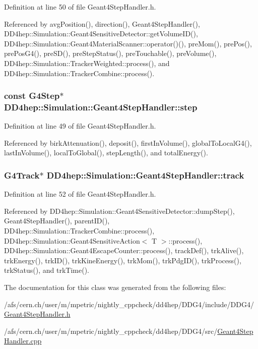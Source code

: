 Definition at line 50 of file Geant4StepHandler.h.

Referenced by avgPosition(), direction(), Geant4StepHandler(), DD4hep::Simulation::Geant4SensitiveDetector::getVolumeID(), DD4hep::Simulation::Geant4MaterialScanner::operator()(), preMom(), prePos(), prePosG4(), preSD(), preStepStatus(), preTouchable(), preVolume(), DD4hep::Simulation::TrackerWeighted::process(), and DD4hep::Simulation::TrackerCombine::process().\hypertarget{class_d_d4hep_1_1_simulation_1_1_geant4_step_handler_a5f8ecf6b8e58ab857df4d639d9b8f235}{
\subsubsection[{step}]{\setlength{\rightskip}{0pt plus 5cm}const G4Step$\ast$ {\bf DD4hep::Simulation::Geant4StepHandler::step}}}
\label{class_d_d4hep_1_1_simulation_1_1_geant4_step_handler_a5f8ecf6b8e58ab857df4d639d9b8f235}


Definition at line 49 of file Geant4StepHandler.h.

Referenced by birkAttenuation(), deposit(), firstInVolume(), globalToLocalG4(), lastInVolume(), localToGlobal(), stepLength(), and totalEnergy().\hypertarget{class_d_d4hep_1_1_simulation_1_1_geant4_step_handler_a8bb7d5d357693c499d319fdc1fa3b34b}{
\subsubsection[{track}]{\setlength{\rightskip}{0pt plus 5cm}G4Track$\ast$ {\bf DD4hep::Simulation::Geant4StepHandler::track}}}
\label{class_d_d4hep_1_1_simulation_1_1_geant4_step_handler_a8bb7d5d357693c499d319fdc1fa3b34b}


Definition at line 52 of file Geant4StepHandler.h.

Referenced by DD4hep::Simulation::Geant4SensitiveDetector::dumpStep(), Geant4StepHandler(), parentID(), DD4hep::Simulation::TrackerCombine::process(), DD4hep::Simulation::Geant4SensitiveAction$<$ T $>$::process(), DD4hep::Simulation::Geant4EscapeCounter::process(), trackDef(), trkAlive(), trkEnergy(), trkID(), trkKineEnergy(), trkMom(), trkPdgID(), trkProcess(), trkStatus(), and trkTime().

The documentation for this class was generated from the following files:\begin{DoxyCompactItemize}
\item 
/afs/cern.ch/user/m/mpetric/nightly\_\-cppcheck/dd4hep/DDG4/include/DDG4/\hyperlink{_geant4_step_handler_8h}{Geant4StepHandler.h}\item 
/afs/cern.ch/user/m/mpetric/nightly\_\-cppcheck/dd4hep/DDG4/src/\hyperlink{_geant4_step_handler_8cpp}{Geant4StepHandler.cpp}\end{DoxyCompactItemize}
